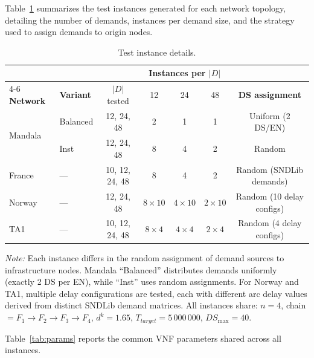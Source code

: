 \documentclass{article}
\begin{document}
\vspace{0.5em}
\noindent Table~\ref{tab:instances} summarizes the test instances generated for each network topology, detailing the number of demands, instances per demand size, and the strategy used to assign demands to origin nodes.

\begin{table}[h!]
\centering
\small
\caption{Test instance details.}
\label{tab:instances}
\begin{tabular}{@{}l l c c c c c@{}}
\toprule
& & & \multicolumn{3}{c}{\textbf{Instances per $|D|$}} & \\
\cmidrule(lr){4-6}
\textbf{Network} & \textbf{Variant} & $|D|$ tested & 12 & 24 & 48 & \textbf{DS assignment} \\
\midrule
\multirow{2}{*}{Mandala} & Balanced & 12, 24, 48 & 2 & 1 & 1 & Uniform (2 DS/EN) \\
                         & Inst     & 12, 24, 48 & 8 & 4 & 2 & Random \\
\midrule
France                   & ---      & 10, 12, 24, 48 & 8 & 4 & 2 & Random (SNDLib demands) \\
\midrule
\multirow{1}{*}{Norway}  & ---      & 12, 24, 48 & $8 \times 10$ & $4 \times 10$ & $2 \times 10$ & Random (10 delay configs) \\
\midrule
\multirow{1}{*}{TA1}     & ---      & 10, 12, 24, 48 & $8 \times 4$ & $4 \times 4$ & $2 \times 4$ & Random (4 delay configs) \\
\bottomrule
\end{tabular}
\vspace{0.3em}

\footnotesize
\textit{Note:} Each instance differs in the random assignment of demand sources to infrastructure nodes. Mandala ``Balanced'' distributes demands uniformly (exactly 2 DS per EN), while ``Inst'' uses random assignments. For Norway and TA1, multiple delay configurations are tested, each with different arc delay values derived from distinct SNDLib demand matrices. All instances share: $n=4$, chain $= F_1 \to F_2 \to F_3 \to F_4$, $d^k = 1.65$, $T_{target} = 5\,000\,000$, $DS_{\max} = 40$.
\end{table}

\vspace{0.5em}
\noindent Table~\ref{tab:params} reports the common VNF parameters shared across all instances.
\end{document}
